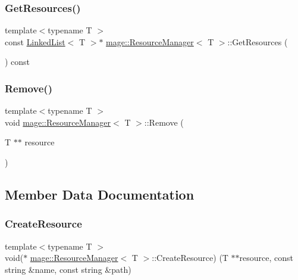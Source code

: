 \hypertarget{classmage_1_1_resource_manager_a33c327ebcff3a851892b7efc26bea295}{}\label{classmage_1_1_resource_manager_a33c327ebcff3a851892b7efc26bea295} 
\subsubsection{\texorpdfstring{Get\+Resources()}{GetResources()}}
{\footnotesize\ttfamily template$<$typename T $>$ \\
const \hyperlink{classmage_1_1_linked_list}{Linked\+List}$<$ T $>$$\ast$ \hyperlink{classmage_1_1_resource_manager}{mage\+::\+Resource\+Manager}$<$ T $>$\+::Get\+Resources (\begin{DoxyParamCaption}{ }\end{DoxyParamCaption}) const}

\hypertarget{classmage_1_1_resource_manager_a9fdc16b5f1627d0684c5a7e870290461}{}\label{classmage_1_1_resource_manager_a9fdc16b5f1627d0684c5a7e870290461} 
\subsubsection{\texorpdfstring{Remove()}{Remove()}}
{\footnotesize\ttfamily template$<$typename T $>$ \\
void \hyperlink{classmage_1_1_resource_manager}{mage\+::\+Resource\+Manager}$<$ T $>$\+::Remove (\begin{DoxyParamCaption}\item[{T $\ast$$\ast$}]{resource }\end{DoxyParamCaption})}



\subsection{Member Data Documentation}
\hypertarget{classmage_1_1_resource_manager_a1175cdd82a5407dd099b53a432ca9a95}{}\label{classmage_1_1_resource_manager_a1175cdd82a5407dd099b53a432ca9a95} 
\subsubsection{\texorpdfstring{Create\+Resource}{CreateResource}}
{\footnotesize\ttfamily template$<$typename T $>$ \\
void($\ast$ \hyperlink{classmage_1_1_resource_manager}{mage\+::\+Resource\+Manager}$<$ T $>$\+::Create\+Resource) (T $\ast$$\ast$resource, const string \&name, const string \&path)\hspace{0.3cm}{\ttfamily [private]}}


